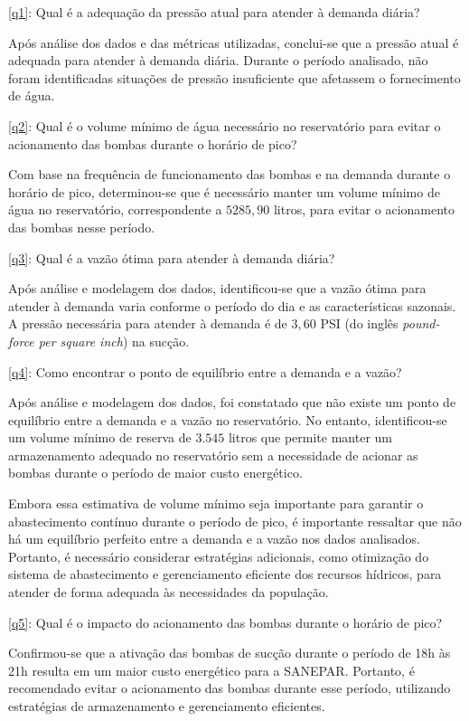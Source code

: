 \noindent\ref{q1}: Qual é a adequação da pressão atual para atender à demanda diária?

Após análise dos dados e das métricas utilizadas, conclui-se que a pressão atual é adequada para atender à demanda diária. Durante o período analisado, não foram identificadas situações de pressão insuficiente que afetassem o fornecimento de água.

\noindent\ref{q2}: Qual é o volume mínimo de água necessário no reservatório para evitar o acionamento das bombas durante o horário de pico?

Com base na frequência de funcionamento das bombas e na demanda durante o horário de pico, determinou-se que é necessário manter um volume mínimo de água no reservatório, correspondente a $5285,90$ litros, para evitar o acionamento das bombas nesse período.

\noindent\ref{q3}: Qual é a vazão ótima para atender à demanda diária?

Após análise e modelagem dos dados, identificou-se que a vazão ótima para atender à demanda varia conforme o período do dia e as características sazonais. A pressão necessária para atender à demanda é de $3,60$ PSI (do inglês \textit{pound-force per square inch}) na sucção.

\noindent\ref{q4}: Como encontrar o ponto de equilíbrio entre a demanda e a vazão?

Após análise e modelagem dos dados, foi constatado que não existe um ponto de equilíbrio entre a demanda e a vazão no reservatório. No entanto, identificou-se um volume mínimo de reserva de $3.545$ litros que permite manter um armazenamento adequado no reservatório sem a necessidade de acionar as bombas durante o período de maior custo energético.

Embora essa estimativa de volume mínimo seja importante para garantir o abastecimento contínuo durante o período de pico, é importante ressaltar que não há um equilíbrio perfeito entre a demanda e a vazão nos dados analisados. Portanto, é necessário considerar estratégias adicionais, como otimização do sistema de abastecimento e gerenciamento eficiente dos recursos hídricos, para atender de forma adequada às necessidades da população.

\noindent\ref{q5}: Qual é o impacto do acionamento das bombas durante o horário de pico?

Confirmou-se que a ativação das bombas de sucção durante o período de 18h às 21h resulta em um maior custo energético para a SANEPAR. Portanto, é recomendado evitar o acionamento das bombas durante esse período, utilizando estratégias de armazenamento e gerenciamento eficientes.

